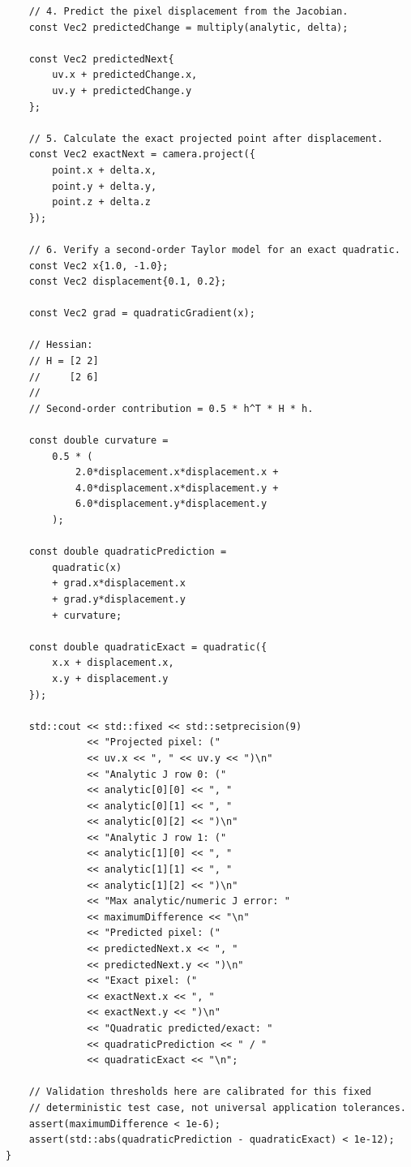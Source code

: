 \begin{verbatim}
    // 4. Predict the pixel displacement from the Jacobian.
    const Vec2 predictedChange = multiply(analytic, delta);

    const Vec2 predictedNext{
        uv.x + predictedChange.x,
        uv.y + predictedChange.y
    };

    // 5. Calculate the exact projected point after displacement.
    const Vec2 exactNext = camera.project({
        point.x + delta.x,
        point.y + delta.y,
        point.z + delta.z
    });

    // 6. Verify a second-order Taylor model for an exact quadratic.
    const Vec2 x{1.0, -1.0};
    const Vec2 displacement{0.1, 0.2};

    const Vec2 grad = quadraticGradient(x);

    // Hessian:
    // H = [2 2]
    //     [2 6]
    //
    // Second-order contribution = 0.5 * h^T * H * h.

    const double curvature =
        0.5 * (
            2.0*displacement.x*displacement.x +
            4.0*displacement.x*displacement.y +
            6.0*displacement.y*displacement.y
        );

    const double quadraticPrediction =
        quadratic(x)
        + grad.x*displacement.x
        + grad.y*displacement.y
        + curvature;

    const double quadraticExact = quadratic({
        x.x + displacement.x,
        x.y + displacement.y
    });

    std::cout << std::fixed << std::setprecision(9)
              << "Projected pixel: ("
              << uv.x << ", " << uv.y << ")\n"
              << "Analytic J row 0: ("
              << analytic[0][0] << ", "
              << analytic[0][1] << ", "
              << analytic[0][2] << ")\n"
              << "Analytic J row 1: ("
              << analytic[1][0] << ", "
              << analytic[1][1] << ", "
              << analytic[1][2] << ")\n"
              << "Max analytic/numeric J error: "
              << maximumDifference << "\n"
              << "Predicted pixel: ("
              << predictedNext.x << ", "
              << predictedNext.y << ")\n"
              << "Exact pixel: ("
              << exactNext.x << ", "
              << exactNext.y << ")\n"
              << "Quadratic predicted/exact: "
              << quadraticPrediction << " / "
              << quadraticExact << "\n";

    // Validation thresholds here are calibrated for this fixed
    // deterministic test case, not universal application tolerances.
    assert(maximumDifference < 1e-6);
    assert(std::abs(quadraticPrediction - quadraticExact) < 1e-12);
}
\end{verbatim}

